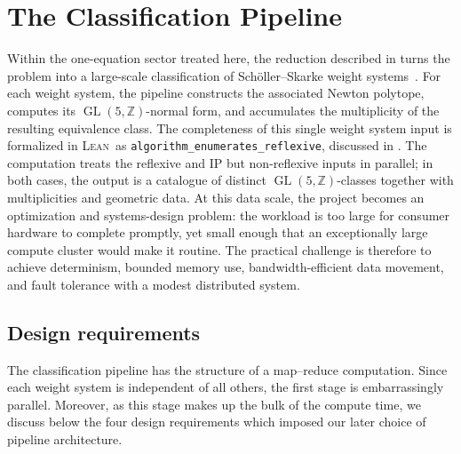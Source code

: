 \documentclass[appliedmath,article,submit,moreauthors]{Definitions/mdpi}
\newcommand{\Z}{\mathbb{Z}}
\newcommand{\GL}{\operatorname{GL}}
\newcommand{\Lean}{\textsc{Lean}}
\begin{document}
\section{The Classification Pipeline}
\label{sec:pipeline}

{\color{blue}Within the one-equation sector treated here,} the reduction
described in  turns the problem into a large-scale classification
of Sch\"oller--Skarke weight systems~\cite{Scholler2019}. For each weight system, the pipeline constructs
the associated Newton polytope, computes its \(\GL(5,\Z)\)-normal form, and
accumulates the multiplicity of the resulting equivalence class.  The
completeness of this single weight system input is formalized in \Lean\ as
\nolinkurl{algorithm\_enumerates\_reflexive}, discussed in
.  The computation treats the reflexive and IP but
non-reflexive inputs in parallel; in both cases, the output is a catalogue of
distinct \(\GL(5,\Z)\)-classes together with multiplicities and geometric data.
At this data scale, the project becomes an optimization and systems-design
problem: the workload is too large for consumer hardware to complete promptly,
yet small enough that an exceptionally large compute cluster would make it
routine. The practical challenge is therefore to achieve determinism, bounded
memory use, bandwidth-efficient data movement, and fault tolerance with a modest
distributed system.


\subsection{Design requirements}
\label{sec:pipe-requirements}

The classification pipeline has the structure of a map--reduce computation.
Since each weight system is independent of all others, the first stage is
embarrassingly parallel. Moreover, as this stage makes up the bulk of the
compute time, we discuss below the four design requirements which imposed our
later choice of pipeline architecture.
\end{document}
